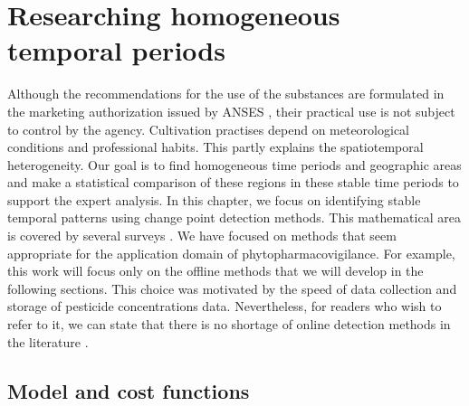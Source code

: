 \chapter{Researching homogeneous temporal periods}\label{chp:3}

\minitoc

\clearpage

Although the recommendations for the use of the substances are formulated in the marketing authorization issued by ANSES \cite{ephy}, their practical use is not subject to control by the agency. Cultivation practises depend on meteorological conditions and professional habits. This partly explains the spatiotemporal heterogeneity. Our goal is to find homogeneous time periods and geographic areas and make a statistical comparison of these regions in these stable time periods to support the expert analysis. In this chapter, we focus on identifying stable temporal patterns using change point detection methods. This mathematical area is covered by several surveys \cite{truong2020,basseville1993detection}. We have focused on methods that seem appropriate for the application domain of phytopharmacovigilance. For example, this work will focus only on the offline methods that we will develop in the following sections. This choice was motivated by the speed of data collection and storage of pesticide concentrations data. Nevertheless, for readers who wish to refer to it, we can state that there is no shortage of online detection methods in the literature \cite{liu2017change,Li2021,hohle2010online,ranganathan2010pliss,li2015m}.

\section{Model and cost functions}\label{chp:3:1}

